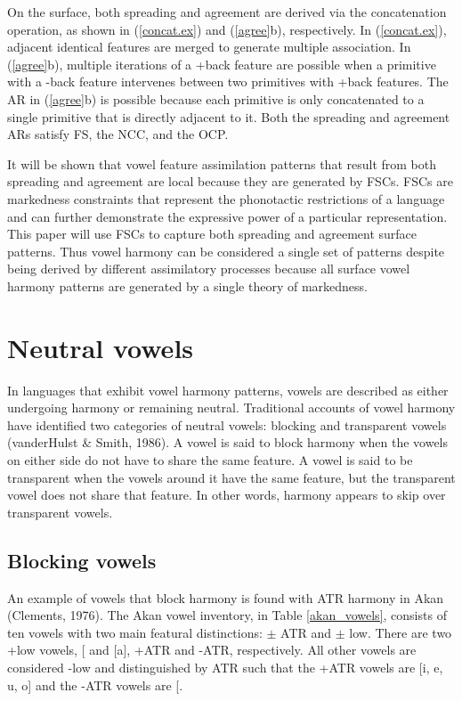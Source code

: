 \documentclass[,doc,floatsintext]{apa6}
\theoremstyle{definition}
\theoremstyle{definition}
\theoremstyle{definition}
\theoremstyle{remark}
\begin{document}
\noindent On the surface, both spreading and agreement are derived via
the concatenation operation, as shown in (\ref{concat.ex}) and
(\ref{agree}b), respectively. In (\ref{concat.ex}), adjacent identical
features are merged to generate multiple association. In (\ref{agree}b),
multiple iterations of a +back feature are possible when a primitive
with a -back feature intervenes between two primitives with +back
features. The AR in (\ref{agree}b) is possible because each primitive is
only concatenated to a single primitive that is directly adjacent to it.
Both the spreading and agreement ARs satisfy FS, the NCC, and the OCP.

It will be shown that vowel feature assimilation patterns that result
from both spreading and agreement are local because they are generated
by FSCs. FSCs are markedness constraints that represent the phonotactic
restrictions of a language and can further demonstrate the expressive
power of a particular representation. This paper will use FSCs to
capture both spreading and agreement surface patterns. Thus vowel
harmony can be considered a single set of patterns despite being derived
by different assimilatory processes because all surface vowel harmony
patterns are generated by a single theory of markedness.

\section{Neutral vowels}\label{neutral-vowels}

In languages that exhibit vowel harmony patterns, vowels are described
as either undergoing harmony or remaining neutral. Traditional accounts
of vowel harmony have identified two categories of neutral vowels:
blocking and transparent vowels (vanderHulst \& Smith, 1986). A vowel is
said to block harmony when the vowels on either side do not have to
share the same feature. A vowel is said to be transparent when the
vowels around it have the same feature, but the transparent vowel does
not share that feature. In other words, harmony appears to skip over
transparent vowels.

\subsection{Blocking vowels}\label{blocking-vowels}

An example of vowels that block harmony is found with ATR harmony in
Akan (Clements, 1976). The Akan vowel inventory, in Table
\ref{akan_vowels}, consists of ten vowels with two main featural
distinctions: \(\pm\) ATR and \(\pm\) low. There are two +low vowels,
{[}\textipa{3}{]} and {[}a{]}, +ATR and -ATR, respectively. All other
vowels are considered -low and distinguished by ATR such that the +ATR
vowels are {[}i, e, u, o{]} and the -ATR vowels are
{[}\textipa{I, E, U, O}{]}.
\end{document}
